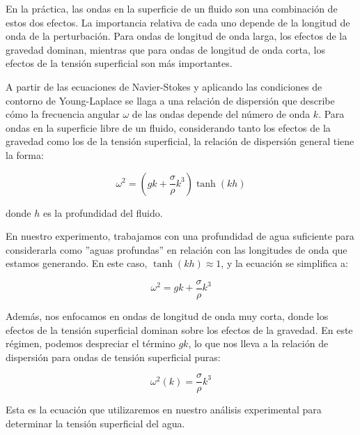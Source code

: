 \vspace{\baselineskip}


En la práctica, las ondas en la superficie de un fluido son una combinación de estos dos efectos. La importancia relativa de cada uno depende de la longitud de onda de la perturbación. Para ondas de longitud de onda larga, los efectos de la gravedad dominan, mientras que para ondas de longitud de onda corta, los efectos de la tensión superficial son más importantes.

\vspace{\baselineskip}

A partir de las ecuaciones de Navier-Stokes y aplicando las condiciones de contorno de Young-Laplace se llaga a una relación de dispersión que  describe cómo la frecuencia angular $\omega$ de las ondas depende del número de onda $k$. Para ondas en la superficie libre de un fluido, considerando tanto los efectos de la gravedad como los de la tensión superficial, la relación de dispersión general tiene la forma:

\begin{equation}
	\omega^2 = (gk + \frac{\sigma}{\rho}k^3)\tanh(kh)
	\label{eq:dispersion_general}
\end{equation}

donde $h$ es la profundidad del fluido. 

\vspace{\baselineskip}

En nuestro experimento, trabajamos con una profundidad de agua suficiente para considerarla como ''aguas profundas'' en relación con las longitudes de onda que estamos generando. En este caso, $\tanh(kh) \approx 1$, y la ecuación se simplifica a:

\begin{equation}
	\omega^2 = gk + \frac{\sigma}{\rho}k^3
	\label{eq:dispersion_simplificada}
\end{equation}

Además, nos enfocamos en ondas de longitud de onda muy corta, donde los efectos de la tensión superficial dominan sobre los efectos de la gravedad. En este régimen, podemos despreciar el término $gk$, lo que nos lleva a la relación de dispersión para ondas de tensión superficial puras:

\begin{equation}
	\omega^2(k) = \frac{\sigma}{\rho} k^3
	\label{eq:dispersion}
\end{equation}

Esta es la ecuación que utilizaremos en nuestro análisis experimental para determinar la tensión superficial del agua.


